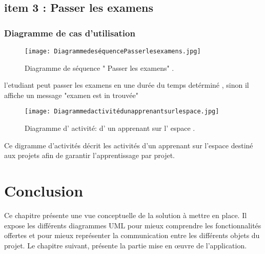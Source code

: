 \subsection{item 3 : Passer les examens}
\subsubsection{Diagramme de cas d’utilisation }


\begin{figure}[ht]
	\centering
	\texttt{[image: DiagrammedeséquencePasserlesexamens.jpg]}
	\caption{Diagramme de séquence " Passer les examens" .}
	\label{fig:Diagramme de séquence " Passer les examens" }
\end{figure}
\FloatBarrier


l’etudiant peut passer les examens en une durée du temps detérminé , sinon il affiche un
message "examen est in trouvée"

\begin{figure}[ht]
	\centering
	\texttt{[image: Diagrammedactivitédunapprenantsurlespace.jpg]}
	\caption{Diagramme d' activité: d' un apprenant sur l' espace .}
	\label{fig:Diagramme d' activité: d' un apprenant sur l' espace }
\end{figure}
\FloatBarrier

Ce digramme d’activités décrit les activités d’un apprenant sur l’espace destiné aux projets
afin de garantir l’apprentissage par projet.




\clearpage


\section{Conclusion}

Ce chapitre présente une vue conceptuelle de la solution à mettre en place. Il expose les différents diagrammes UML pour mieux comprendre les fonctionnalités offertes et pour mieux représenter la communication entre les différents objets du projet. Le chapitre suivant, présente la partie mise en œuvre de l’application.


